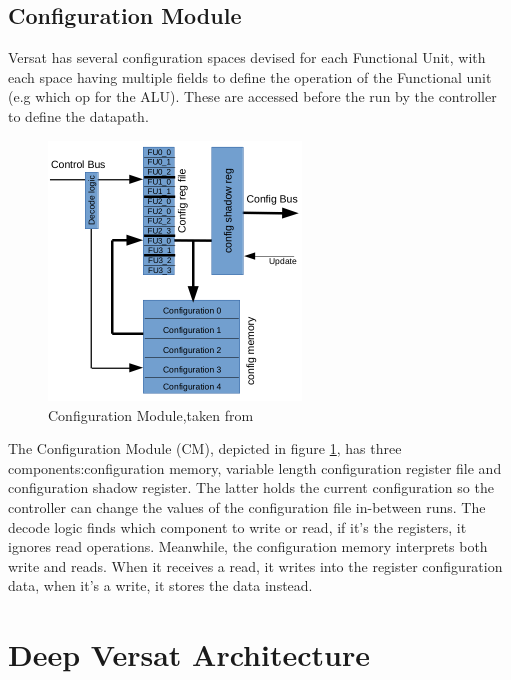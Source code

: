 \newpage
\subsection{Configuration Module}
\quad Versat has several configuration spaces devised for each Functional Unit,
with each space having multiple fields to define the operation of the Functional unit (e.g which op for the ALU).
These are accessed before the run by the controller to define the datapath.

\begin{figure}[!htbp]
    \centering
    \includegraphics[width=0.6\textwidth]{Figures/conf.png}
    \caption{Configuration Module,taken from~\cite{sousa:controller}}
    \label{figure:conf}
\end{figure} 

The Configuration Module (CM), depicted in figure \ref{figure:conf}, 
has three components:configuration memory, variable length configuration register file 
and configuration shadow register.
The latter holds the current configuration so the controller can change the values of the configuration file in-between runs.
The decode logic finds which component to write or read, if it's the registers, it ignores read operations.
Meanwhile, the configuration memory interprets both write and reads. When it receives a read,
it writes into the register configuration data, when it's a write, it stores the data instead.


\newpage
\section{Deep Versat Architecture}


